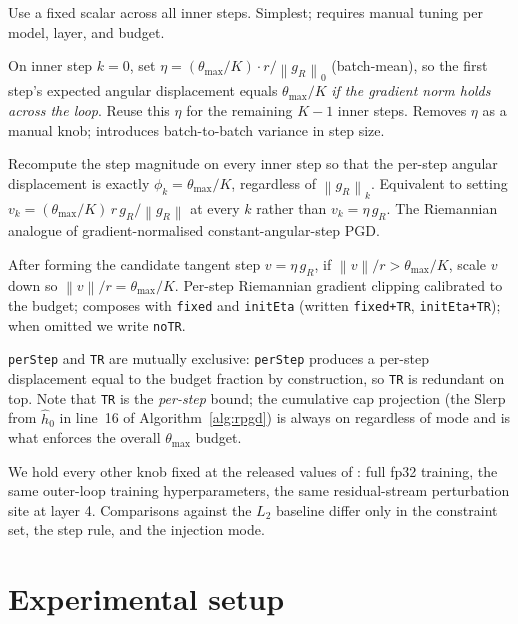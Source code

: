 \documentclass[11pt]{article}
\newcommand{\hh}{\hat h}
\newcommand{\thmax}{\theta_{\max}}
\newcommand{\norm}[1]{\left\lVert#1\right\rVert}
\begin{document}
\begin{description}[leftmargin=*, style=nextline]
\item[Fixed $\eta$ (\texttt{fixed}).] Use a fixed scalar across all inner steps. Simplest; requires manual tuning per model, layer, and budget.

\item[Init calibration (\texttt{initEta}).] On inner step $k = 0$, set $\eta = (\thmax/K) \cdot r / \norm{g_R}_0$ (batch-mean), so the first step's expected angular displacement equals $\thmax/K$ \emph{if the gradient norm holds across the loop}. Reuse this $\eta$ for the remaining $K-1$ inner steps. Removes $\eta$ as a manual knob; introduces batch-to-batch variance in step size.

\item[Per-step calibration (\texttt{perStep}).] Recompute the step magnitude on every inner step so that the per-step angular displacement is exactly $\phi_k = \thmax/K$, regardless of $\norm{g_R}_k$. Equivalent to setting $v_k = (\thmax/K)\,r\,g_R/\norm{g_R}$ at every $k$ rather than $v_k = \eta\,g_R$. The Riemannian analogue of gradient-normalised constant-angular-step PGD.

\item[Trust region (\texttt{TR}).] After forming the candidate tangent step $v = \eta\,g_R$, if $\norm{v}/r > \thmax/K$, scale $v$ down so $\norm{v}/r = \thmax/K$. Per-step Riemannian gradient clipping calibrated to the budget; composes with \texttt{fixed} and \texttt{initEta} (written \texttt{fixed+TR}, \texttt{initEta+TR}); when omitted we write \texttt{noTR}.
\end{description}

\texttt{perStep} and \texttt{TR} are mutually exclusive: \texttt{perStep} produces a per-step displacement equal to the budget fraction by construction, so \texttt{TR} is redundant on top. Note that \texttt{TR} is the \emph{per-step} bound; the cumulative cap projection (the Slerp from $\hh_0$ in line~16 of Algorithm~\ref{alg:rpgd}) is always on regardless of mode and is what enforces the overall $\thmax$ budget.

We hold every other knob fixed at the released values of \citet{casper2024lat}: full fp32 training, the same outer-loop training hyperparameters, the same residual-stream perturbation site at layer 4. Comparisons against the $L_2$ baseline differ only in the constraint set, the step rule, and the injection mode.

\section{Experimental setup}
\end{document}
